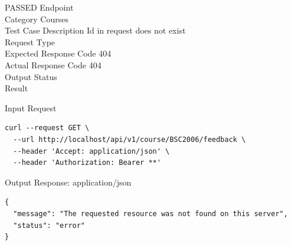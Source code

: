 \begin{testcase}{85}{PASSED}
Endpoint \hfill {}\\
Category \hfill Courses\\
Test Case Description \hfill Id in request does not exist\\

Request Type    \hfill {}\\
Expected Response Code    \hfill 404\\
Actual Response Code    \hfill 404\\

Output Status \hfill {}\\
Result \hfill {}

\begin{ipblock}{Input Request}
\begin{verbatim}
curl --request GET \
  --url http://localhost/api/v1/course/BSC2006/feedback \
  --header 'Accept: application/json' \
  --header 'Authorization: Bearer **'
\end{verbatim}
\end{ipblock}

\begin{opblock}{Output Response: application/json}
\begin{verbatim}
{
  "message": "The requested resource was not found on this server",
  "status": "error"
}
\end{verbatim}
\end{opblock}
\end{testcase}


